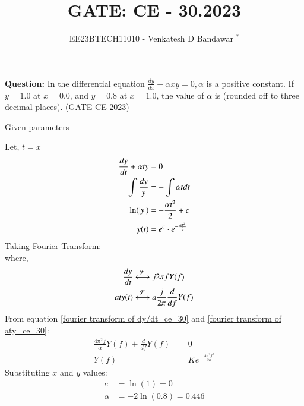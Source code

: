 \documentclass[journal,12pt,twocolumn]{IEEEtran}
\theoremstyle{remark}
\begin{document}

\vspace{3cm}

\title{GATE: CE - 30.2023}
\author{EE23BTECH11010 - Venkatesh D Bandawar $^{*}$%
}
\maketitle
\bigskip


\textbf{Question:} In the differential equation $\frac{dy}{dx} + \alpha x y = 0, \alpha$ is a positive constant. If $y = 1.0$ at
$x = 0.0$, and $y = 0.8$ at $x = 1.0$, the value of $\alpha$ is (rounded off to three decimal places).  \hfill(GATE CE 2023)

\solution
\begin{table}[!h] 
\centering

\caption{Given parameters}
\label{given parameters list.gate.ce.30}
\end{table}

Let, $t=x$
\begin{align}
    \frac{dy}{dt} + \alpha t y &= 0\\
    \int \frac{dy}{y} &= - \int \alpha t dt\\
    \ln(\left\vert y\right\vert) &= - \frac{\alpha t^2}{2} + c\\
    y(t) &= e^c\cdot e^{- \frac{\alpha t^2}{2}} 
\end{align}
Taking Fourier Transform:\\
where,
\begin{align}
    \frac{dy}{dt} & \system{\mathcal{F}} j 2\pi f Y(f) \label{fourier transform of dy/dt_ce_30}\\
    a t y(t) & \system{\mathcal{F}} a \frac{j}{2\pi} \frac{d}{df} Y(f)\label{fourier transform of aty_ce_30}
\end{align}
From equation \eqref{fourier transform of dy/dt_ce_30} and \eqref{fourier transform of aty_ce_30}:
\begin{align}
    \frac{4\pi^2 f}{\alpha} Y(f) + \frac{d}{df} Y(f) &= 0\\
    Y(f) &= K e^{-\frac{4\pi^2 f^2}{2\alpha}}
\end{align}
Substituting $x$ and $y$ values:
\begin{align}
    c &= \ln(1) = 0\\
    \alpha &= -2 \ln(0.8) = 0.446
\end{align}
\end{document}
